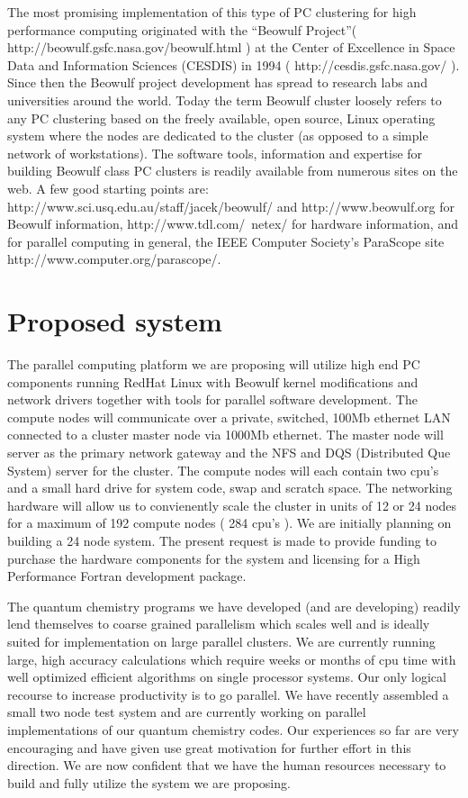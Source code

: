 The most  promising implementation of this type of PC clustering
for high performance computing
originated with the ``Beowulf Project''(
http://beowulf.gsfc.nasa.gov/beowulf.html ) at the Center of
Excellence in Space Data and Information Sciences (CESDIS) in 1994 (
http://cesdis.gsfc.nasa.gov/ ). Since then the Beowulf project
development has spread to research labs and universities around the
world.  Today the term Beowulf cluster loosely refers to any PC  
clustering  based on the freely available, open source, Linux operating
system where the nodes are dedicated to the cluster (as opposed to a simple 
network of workstations).  The software tools, information and expertise for building
Beowulf class PC clusters is readily available from numerous sites on
the web. A few good starting points are:
http://www.sci.usq.edu.au/staff/jacek/beowulf/ and
http://www.beowulf.org for Beowulf information, 
http://www.tdl.com/~netex/ for hardware information,
  and for parallel
computing in general, the IEEE Computer Society's ParaScope site
http://www.computer.org/parascope/.

\section{Proposed system}

The parallel computing platform we are proposing will utilize high end
PC components running RedHat Linux with Beowulf kernel modifications
and network drivers together with tools for parallel software
development. The compute nodes will communicate over a private,
switched, 100Mb ethernet LAN connected to a cluster master node via
1000Mb ethernet. The master node will server as the primary network
gateway and the NFS and DQS (Distributed Que System) server for the  cluster.
The compute nodes will each contain two cpu's and a small hard drive
for system code, swap and scratch space. The
networking hardware will allow us to convienently scale the cluster in units of 12
or 24 nodes for a maximum of 192 compute nodes ( 284 cpu's ). We are initially
planning on building a 24 node system. The present request is made to
provide funding to purchase the hardware components for the system and
licensing for a High Performance Fortran development package.

The quantum chemistry programs we have developed (and are developing)
readily lend themselves to coarse grained parallelism which scales
well and is ideally suited for implementation on large parallel
clusters. We are currently running large, high accuracy calculations
which require weeks or months of cpu time with well optimized
efficient algorithms on single processor systems.
Our only logical recourse to increase
productivity is to go parallel. We have recently assembled a small two node
test system and are currently working on parallel implementations of
our quantum chemistry codes. Our experiences so far are very
encouraging and have given use great motivation for further effort in
this direction. We are now confident that we have the human resources
necessary to build and fully utilize the system we are proposing.

